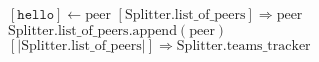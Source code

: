 \documentclass{article}
\begin{document}
\pagestyle{empty}

\newcommand{\send}{\Rightarrow}
\newcommand{\sendto}{\rightarrow}
\newcommand{\recv}{\Leftarrow}
\algrenewcommand{}

\begin{algorithmic}

  \State $[\mathtt{hello}] \leftarrow \mathrm{peer}$
  \State $[\mathrm{Splitter}.\mathrm{list\_of\_peers}] \send \mathrm{peer}$
  \State $\mathrm{Splitter}.\mathrm{list\_of\_peers}.\mathrm{append}(\mathrm{peer})$
  \State $[|\mathrm{Splitter}.\mathrm{list\_of\_peers}|] \send \mathrm{\mathrm{Splitter}.teams\_tracker}$
  \EndWhile
  \EndProcedure
  
\end{algorithmic}
\end{document}
